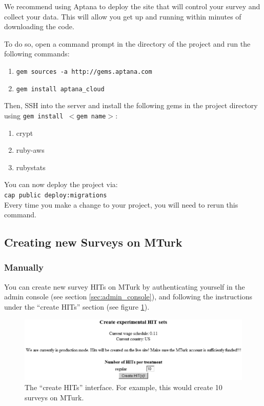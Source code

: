 \documentclass[12pt]{article}
\begin{document}
We recommend using Aptana to deploy the site that will control your survey and collect your data. This will allow you get up and running within minutes of downloading the code.

To do so, open a command prompt in the directory of the project and run the following commands:

\begin{enumerate}
\item \tt{gem sources -a http://gems.aptana.com}
\item \tt{gem install aptana\_cloud}
\end{enumerate} 

Then, SSH into the server and install the following gems in the project directory using \texttt{gem install $<$gem name$>$}:

\begin{enumerate}
\item crypt
\item ruby-aws
\item rubystats
\end{enumerate}


You can now deploy the project via:\\

{\tt{cap public deploy:migrations}}\\

Every time you make a change to your project, you will need to rerun this command.

\subsection{Creating new Surveys on MTurk}

\subsubsection*{Manually}

You can create new survey HITs on MTurk by authenticating yourself in the admin console (see section \ref{sec:admin_console}), and following the instructions under the ``create HITs'' section (see figure \ref{fig:create_hits}).

\begin{figure}[htp]
\centering
\includegraphics[width=6in]{figs/create_hits.eps}
\caption{The ``create HITs'' interface. For example, this would create 10 surveys on MTurk.}
\label{fig:create_hits}
\end{figure}
\end{document}
